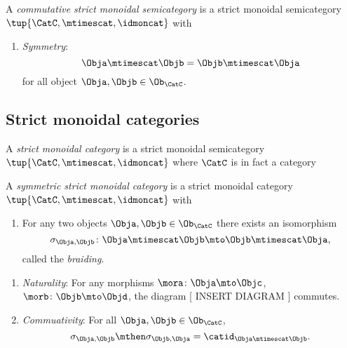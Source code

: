 {   \begin{ctdefinition}
        A \emph{commutative strict monoidal semicategory} is a strict monoidal semicategory  $\tup{\CatC, \mtimescat, \idmoncat}$ with 
        
\condit
        
 \begin{enumerate}
 \item \emph{Symmetry}:
 \begin{equation}
     \Obja \mtimescat \Objb = \Objb \mtimescat \Obja
\end{equation}
for all object $\Obja, \Objb \in \Ob_\CatC$.
        \end{enumerate} 
    \end{ctdefinition}

   
   \subsection{Strict monoidal categories}
   
   
     \begin{ctdefinition}
        A \emph{strict monoidal category} is a strict monoidal semicategory $\tup{\CatC, \mtimescat, \idmoncat}$ where $\CatC$ is in fact a category 
    \end{ctdefinition}

  \begin{ctdefinition}
        A \emph{symmetric strict monoidal category} is a strict monoidal category $\tup{\CatC, \mtimescat, \idmoncat}$ with 
        
        \constit
        
        \begin{enumerate}
        \item For any two objects $\Obja, \Objb \in \Ob_\CatC$ there exists an isomorphism 
        \begin{equation}
        \sigma_{\Obja, \Objb} \colon \Obja \mtimescat   \Objb \mto \Objb \mtimescat   \Obja,
        \end{equation}
        called the \emph{braiding}.
        \end{enumerate}
        
        \condit
        
        \begin{enumerate} 
        \item \emph{Naturality}: For any morphisms $\mora \colon \Obja \mto \Objc$, $\morb \colon \Objb \mto \Objd$, the diagram 
        [ INSERT DIAGRAM ]
        commutes.
        \item \emph{Commuativity}: For all $\Obja, \Objb \in \Ob_\CatC$,
        \begin{equation}
        \sigma_{\Obja, \Objb} \mthen \sigma_{\Objb, \Obja} = \catid_{\Obja \mtimescat   \Objb}.
        \end{equation}
        \end{enumerate}
        

\end{ctdefinition}}
